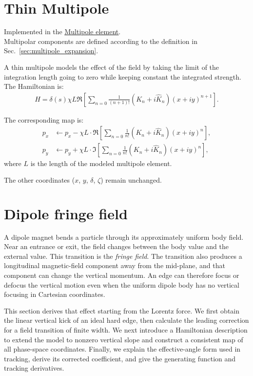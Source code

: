 \section{Thin Multipole}

Implemented in the \href{https://xsuite.readthedocs.io/en/latest/apireference.html#multipole}{\underline{Multipole element}}.
~\\

Multipolar components are defined according to the definition in Sec.~\ref{sec:multipole_expansion}.


A thin multipole models the effect of the field by taking the limit of the integration
length going to zero while keeping constant the integrated strength. The Hamiltonian is:
\begin{align}
  H= \delta(s) \chi L \Re\left[\sum_{n=0} \frac{1}{(n+1)!}(K_n + i\hat K_n) (x+iy)^{n+1} \right].
\end{align}

The corresponding map is:
\begin{align}
  p_x &\leftarrow p_x - \chi L\cdot\Re\left[\sum_{n=0} \frac{1}{n!} (K_n + i\hat K_n) (x+iy)^n \right], \\
  p_y &\leftarrow p_y + \chi L\cdot\Im\left[\sum_{n=0} \frac{1}{n!} (K_n + i\hat K_n) (x+iy)^n \right],
\end{align}
where $L$ is the length of the modeled multipole element.

The other coordinates ($x$, $y$, $\delta$, $\zeta$) remain unchanged.

\section{Dipole fringe field} \label{sec:DipoleFringeField}

A dipole magnet bends a particle through its approximately uniform body
field. Near an entrance or exit, the field changes between the body value
and the external value. This transition is the \emph{fringe field}. The
transition also produces a longitudinal magnetic-field component away from
the mid-plane, and that component can change the vertical momentum.
An edge can therefore focus or defocus the vertical motion even when the
uniform dipole body has no vertical focusing in Cartesian coordinates.

This section derives that effect starting from the Lorentz force. We first
obtain the linear vertical kick of an ideal hard edge, then calculate the
leading correction for a field transition of finite width. We next introduce
a Hamiltonian description to extend the model to nonzero vertical slope and
construct a consistent map of all phase-space coordinates. Finally, we
explain the effective-angle form used in tracking, derive its corrected
coefficient, and give the generating function and tracking derivatives.

